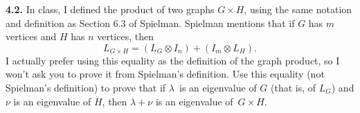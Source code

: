 \documentclass[11pt]{article}
\begin{document}
\par\medskip
{\bf 4.2.} 
In class, I defined the product of two graphs $G\times H$, 
using the same notation and definition as Section 6.3 of Spielman.
Spielman mentions that if $G$ has $m$ vertices and $H$ has $n$ vertices, then
$$
L_{G \times H} = (L_G \otimes I_n) + (I_m \otimes L_H).
$$
I actually prefer using this equality as the definition of the graph product,
so I won't ask you to prove it from Spielman's definition.
Use this equality (not Spielman's definition) to prove
that if $\lambda$~is an eigenvalue of $G$ (that is, of $L_G$) and
$\nu$ is an eigenvalue of $H$, then $\lambda+\nu$ is an eigenvalue of~$G\times H$.
\end{document}
